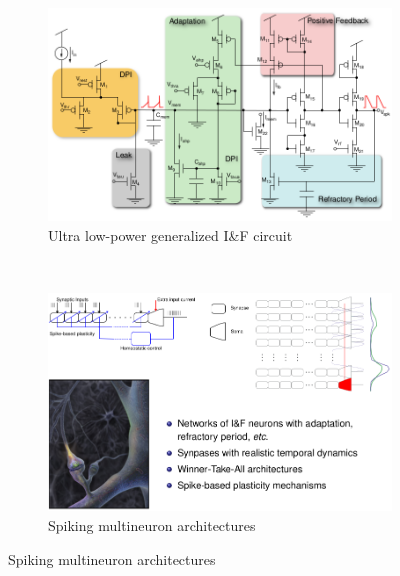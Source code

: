 \documentclass[a4paper, 12pt]{article}
\begin{document}
\begin{figure}[H]
	\centering
	\begin{subfigure}[b]{0.5\textwidth}
		\centering
		\includegraphics[width=\textwidth]{IanF-circuit.png}
		\caption{Ultra low-power generalized I\&F circuit}
	\end{subfigure}%
	~
	\begin{subfigure}[b]{0.5\textwidth}
		\centering
		\includegraphics[width=\textwidth]{multineuron-circuit.png}
		\caption{Spiking multineuron architectures}
	\end{subfigure}
\end{figure}

\newpage
\end{document}
